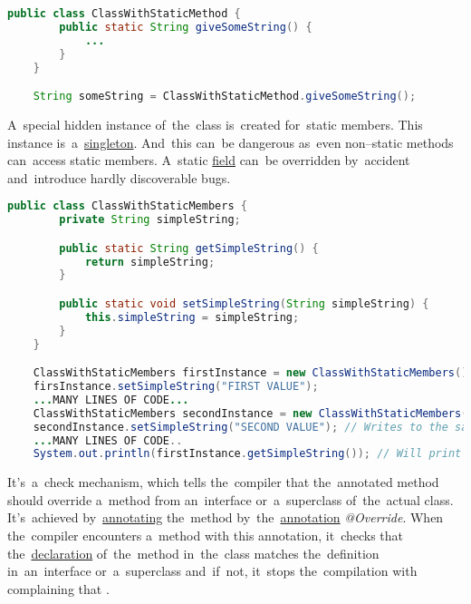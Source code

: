\begin{lstlisting}[language=Java]
    public class ClassWithStaticMethod {
        public static String giveSomeString() {
            ...
        }
    }

    String someString = ClassWithStaticMethod.giveSomeString();
\end{lstlisting}

\warning A~special hidden instance of~the~class is~created for~static members.
This instance is~a~\hyperref[singletondp]{singleton}.
And~this can~be dangerous as~even non--static methods can~access static members.
A~static \hyperref[variablefieldproperty]{field} can~be overridden by~accident and~introduce hardly discoverable bugs.

\begin{lstlisting}[language=Java]
    public class ClassWithStaticMembers {
        private String simpleString;

        public static String getSimpleString() {
            return simpleString;
        }

        public static void setSimpleString(String simpleString) {
            this.simpleString = simpleString;
        }
    }

    ClassWithStaticMembers firstInstance = new ClassWithStaticMembers();
    firsInstance.setSimpleString("FIRST VALUE");
    ...MANY LINES OF CODE...
    ClassWithStaticMembers secondInstance = new ClassWithStaticMembers();
    secondInstance.setSimpleString("SECOND VALUE"); // Writes to the same instance
    ...MANY LINES OF CODE..
    System.out.println(firstInstance.getSimpleString()); // Will print "SECOND VALUE"
\end{lstlisting}

\label{javafinal}

\label{noaccessmodifier}


\label{javaoverride}
It's~a~check mechanism, which tells the~compiler that the~annotated method should override a~method from an~interface or~a~superclass of~the~actual class.
It's~achieved by~\hyperref[javaannotation]{annotating} the~method by~the~\hyperref[javaannotation]{annotation} \textit{@Override}.
When the~compiler encounters a~method with this annotation, it~checks that the~\hyperref[declarationdefinition]{declaration} of~the~method in~the~class matches the~definition in~an~interface or~a~superclass and~if~not, it~stops the~compilation with complaining that .


